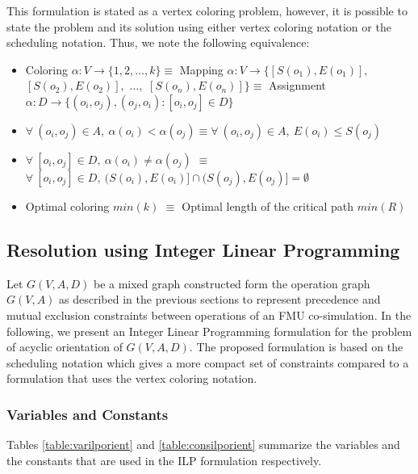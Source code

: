 This formulation is stated as a vertex coloring problem, however, it is possible to state the problem and its solution using either vertex coloring notation or the scheduling notation. Thus, we note the following equivalence:

\begin{itemize}[label={},topsep=1pt,parsep=1pt,partopsep=1pt,leftmargin=*]	
\item Coloring $\alpha: V \rightarrow \{1, 2, \ldots, k\} \equiv$ Mapping $\alpha: V \rightarrow \{[S(o_1), E(o_1)],$ $[S(o_2), E(o_2)],$ $\ldots,$ $[S(o_n), E(o_n)]\} \equiv$ Assignment $\alpha: D \rightarrow \{(o_i,o_j),(o_j,o_i): [o_i,o_j] \in D\}$
\item $\forall\ (o_i,o_j) \in A,\ \alpha(o_i) < \alpha(o_j) \equiv \forall\ (o_i,o_j) \in A,\ E(o_i) \leq S(o_j)$
\item $\forall\ [o_i,o_j] \in D,\ \alpha(o_i) \neq \alpha(o_j)$ $\equiv$ $\forall\ [o_i,o_j] \in D,\  (S(o_i), E(o_i)] \cap (S(o_j), E(o_j)] = \emptyset$
\item Optimal coloring $min(k)$ $\equiv$ Optimal length of the critical path $min(R)$
\end{itemize}

\subsection{Resolution using Integer Linear Programming}

Let $G(V,A,D)$ be a mixed graph constructed form the operation graph $G(V,A)$ as described in the previous sections to represent precedence and mutual exclusion constraints between operations of an FMU co-simulation. In the following, we present an Integer Linear Programming formulation for the problem of acyclic orientation of $G(V,A,D)$. The proposed formulation is based on the scheduling notation which gives a more compact set of constraints compared to a formulation that uses the vertex coloring notation.

\subsubsection{Variables and Constants}

Tables \ref{table:varilporient} and \ref{table:consilporient} summarize the variables and the constants that are used in the ILP formulation respectively.


